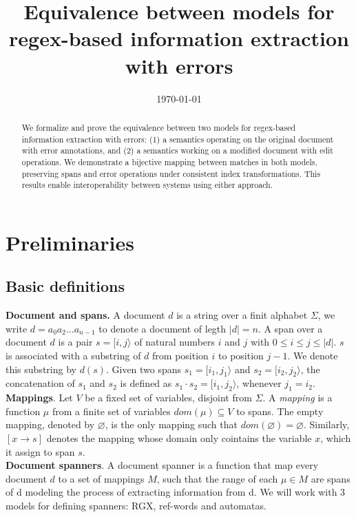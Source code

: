 \documentclass{article}
\title{Equivalence between models for regex-based information extraction with errors}
\date{\today}
\begin{document}
\maketitle

\begin{abstract}
We formalize and prove the equivalence between two models for regex-based information extraction with errors: (1) a semantics operating on the original document with error annotations, and (2) a semantics working on a modified document with edit operations. We demonstrate a bijective mapping between matches in both models, preserving spans and error operations under consistent index transformations. This results enable interoperability between systems using either approach.
\end{abstract}

\section{Preliminaries}

\subsection{Basic definitions}

\textbf{Document and spans.} A document $d$ is a string over a finit alphabet $\Sigma$, we write $d= a_0a_2...a_{n-1}$ to denote a document of legth $|d| = n$. A span over a document $d$ is a pair $s = [i, j\rangle$ of natural numbers $i$ and $j$ with $0 \leq i \leq j \leq |d|$. $s$ is associated with a substring of $d$ from position $i$ to position $j-1$. We denote this substring by $d(s)$. Given two spans $s_1 = [i_1, j_1\rangle$ and $s_2 = [i_2, j_2\rangle$, the concatenation of $s_1$ and $s_2$ is defined as $s_1 \cdot s_2 = [i_1, j_2\rangle$, whenever $j_1 = i_2$.\\

\textbf{Mappings}. Let $V$ be a fixed set of variables, disjoint from $\Sigma$. A \textit{mapping} is a function $\mu$ from a finite set of variables $dom(\mu) \subseteq V$ to spans. The empty mapping, denoted by $\varnothing$, is the only mapping such that $dom(\varnothing) = \varnothing$. Similarly, $[x \xrightarrow{} s]$ denotes the mapping whose domain only cointains the variable $x$, which it assign to span $s$.\\

\textbf{Document spanners}. A document spanner is a function that map every document $d$ to a set of mappings $M$, such that the range of each $\mu \in M$ are spans of d modeling the process of extracting information from d. We will work with 3 models for defining spanners: RGX, ref-words and automatas.\\
\end{document}
